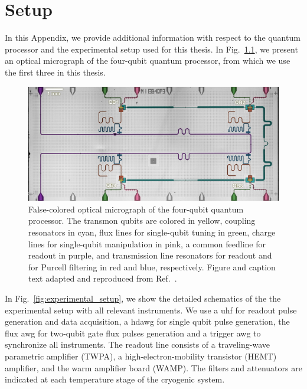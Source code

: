 \chapter{Setup}
\label{app:setup}
In this Appendix, we provide additional information with respect to the quantum processor and the experimental setup used for this thesis. In Fig.~\ref{fig:BF1_device_picture}, we present an optical micrograph of the four-qubit quantum processor, from which we use the first three in this thesis.

\begin{figure}[htp]
  \centering
 \includegraphics[width=\textwidth]{appendices/setup/figs/BF1_device.png}
 \caption{False-colored optical micrograph of the four-qubit quantum processor. The transmon qubits are colored in yellow, coupling resonators in
cyan, flux lines for single-qubit tuning in green, charge lines for single-qubit manipulation in pink, a common feedline for readout in purple,
and transmission line resonators for readout and for Purcell filtering in red and blue, respectively. Figure and caption text adapted and reproduced from Ref.~\cite{Andersen2019a}.}
 \label{fig:BF1_device_picture}
\end{figure}

In Fig.~\ref{fig:experimental_setup}, we show the detailed schematics of the the experimental setup with all relevant instruments. We use a \gls{uhf} for readout pulse generation and data acquisition, a \gls{hdawg} for single qubit pulse generation, the flux \gls{awg} for two-qubit gate flux pulses generation and a trigger \gls{awg} to synchronize all instruments. The readout line consists of a traveling-wave parametric amplifier (TWPA), a high-electron-mobility transistor (HEMT) amplifier, and the warm amplifier board (WAMP). The filters and attenuators are indicated at each temperature stage of the cryogenic system.

